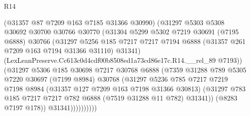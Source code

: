 \begin{lexlean}{R14}
\begin{coremodule}
                            (@31357 @87 @7209 @163 @7185 @31366 @30990)
                            (@31297
                              @5303
                              @5308
                              @30692
                              @30700
                              @30766
                              @30770
                              (@31304
                                @5299
                                @5302
                                @7219
                                @30691
                                (@7195 @6888)
                                @30766
                                (@31297
                                  @5256
                                  @185
                                  @7217
                                  @7217
                                  @7194
                                  @6888
                                  (@31357 @261 @7209 @163 @7194 @31366 @31110)
                                  @31341)
                                (LexLeanPreserve.Cc613c0d4cdf00b8508ed1a73cd86e17c.R14.__rel_89
                                  @7193))
                              (@31297
                                @5306
                                @185
                                @30698
                                @7217
                                @30768
                                @6888
                                (@7359
                                  @31288
                                  @789
                                  @5305
                                  @7220
                                  @30697
                                  (@7199 @8984)
                                  @30768
                                  (@31297
                                    @5236
                                    @785
                                    @7217
                                    @7219
                                    @7198
                                    @8984
                                    (@31357 @127 @7209 @163 @7198 @31366 @30813)
                                    (@31297
                                      @783
                                      @185
                                      @7217
                                      @7217
                                      @782
                                      @6888
                                      (@7519 @31288 @11 @782)
                                      @31341))
                                  (@8283 @7197 @178))
                                @31341))))))))))

\end{coremodule}
\end{lexlean}
